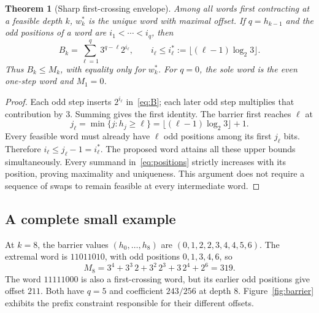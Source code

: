 \documentclass[11pt,a4paper]{amsart}
\newtheorem{theorem}{Theorem}[section]
\theoremstyle{definition}
\theoremstyle{remark}
\begin{document}
\begin{theorem}[Sharp first-crossing envelope]\label{thm:envelope}
Among all words first contracting at a feasible depth $k$, $w_k^*$ is the
unique word with maximal offset. If $q=h_{k-1}$ and the odd positions of
a word are $i_1<\cdots<i_q$, then
\begin{equation}\label{eq:positions}
B_k=\sum_{\ell=1}^q3^{q-\ell}2^{i_\ell},\qquad
i_\ell\le i_\ell^*:=\lfloor(\ell-1)\log_2 3\rfloor.
\end{equation}
Thus $B_k\le M_k$, with equality only for $w_k^*$.
For $q=0$, the sole word is the even one-step word and $M_1=0$.
\end{theorem}
\begin{proof}
Each odd step inserts $2^{i_\ell}$ in~\eqref{eq:B}; each later odd step
multiplies that contribution by 3. Summing gives the first identity.
The barrier first reaches $\ell$ at
\[
j_\ell=\min\{j:h_j\ge\ell\}
=\lfloor(\ell-1)\log_2 3\rfloor+1.
\]
Every feasible word must already have $\ell$ odd positions among its
first $j_\ell$ bits. Therefore $i_\ell\le j_\ell-1=i_\ell^*$.
The proposed word attains all these upper bounds simultaneously.
Every summand in~\eqref{eq:positions} strictly increases with its
position, proving maximality and uniqueness. This argument does not
require a sequence of swaps to remain feasible at every intermediate word.
\end{proof}


\subsection*{A complete small example}
At $k=8$, the barrier values $(h_0,\ldots,h_8)$ are
$(0,1,2,2,3,4,4,5,6)$. The extremal word is $11011010$, with
odd positions $0,1,3,4,6$, so
\[
M_8=3^4+3^3\,2+3^2\,2^3+3\,2^4+2^6=319.
\]
The word $11111000$ is also a first-crossing word, but its earlier odd
positions give offset $211$. Both have $q=5$ and coefficient
$243/256$ at depth 8. Figure~\ref{fig:barrier} exhibits the prefix
constraint responsible for their different offsets.
\end{document}
